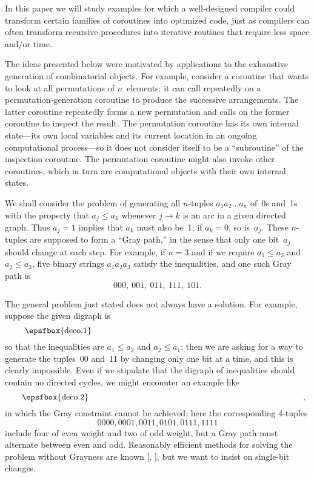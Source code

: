 In this paper we will study examples for which a well-designed
compiler could transform certain families of coroutines
into optimized code, just as compilers
can often transform recursive procedures into iterative routines that require
less space and/or time.

The ideas presented below were motivated by applications to
the exhaustive generation of combinatorial objects. For example,
consider a coroutine that wants to look at all permutations
of $n$~elements; it can call repeatedly on a
permutation-generation coroutine to produce the successive
arrangements. The latter coroutine repeatedly forms a new
permutation and calls on the former coroutine to inspect the
result. The permutation coroutine has its own internal
state\dash---its own local variables and its current location in
an ongoing computational process\dash---so it does not consider
itself to be a ``subroutine'' of the inspection coroutine.
The permutation coroutine might also invoke other
coroutines, which in turn are computational objects with
their own internal states.

We shall consider the problem of generating all $n$-tuples
$a_1a_2\ldots a_n$ of~0s and~1s with the property that $a_j
\le a_k$ whenever $j\to k$ is an arc in a given directed
graph. Thus $a_j=1$ implies that $a_k$ must also be~1;
if $a_k=0$, so is~$a_j$.
These $n$-tuples are supposed to form a ``Gray path,''
in the sense that only one bit~$a_j$ should change at each
step. For example, if $n=3$ and if we require $a_1\le a_3$ and $a_2\le a_3$,
five binary strings $a_1a_2a_3$ satisfy the inequalities, and one such
Gray path is
$$000,\ 001,\ 011,\ 111,\ 101.$$

The general problem just stated does not always have a
solution. For example, suppose the given digraph is 
$$\vcenter{\epsfbox{deco.1}}$$
so that the inequalities are $a_1\le a_2$ and $a_2\le a_1$;
then we are asking for a way to generate the tuples~00
and~11 by changing only one bit at a time, and this is
clearly impossible. Even if we stipulate that the digraph of
inequalities should contain no directed cycles,
we might encounter an example like
$$\vcenter{\epsfbox{deco.2}}\,\,,$$
in which the Gray constraint cannot be achieved; here
the corresponding 4-tuples
$$0000, 0001, 0011, 0101, 0111, 1111$$
include four of even weight and two of odd weight, but a Gray
path must alternate between even and odd. Reasonably efficient methods
for solving the problem without Grayness are known
[\Squire, \Steiner], but we want to insist on single-bit
changes.


